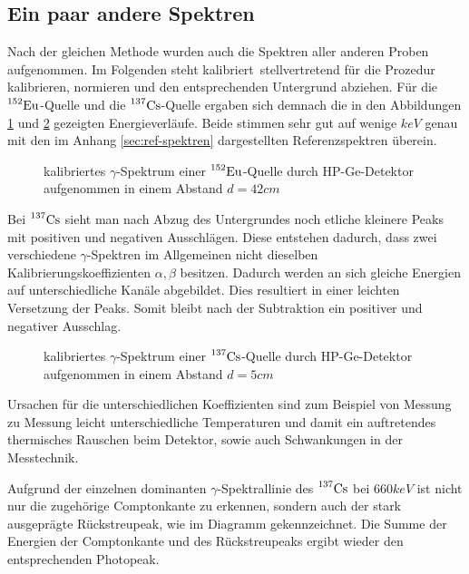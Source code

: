 	\FloatBarrier
	\subsection{Ein paar andere Spektren}
	\label{ssec:andere spektren}
		
		Nach der gleichen Methode wurden auch die Spektren aller anderen Proben aufgenommen.
		Im Folgenden steht \glqq kalibriert\grqq\ stellvertretend für die Prozedur kalibrieren, normieren und den entsprechenden Untergrund abziehen.
		Für die $\prescript{152}{}{\mathrm{Eu}}$-Quelle und die $\prescript{137}{}{\mathrm{Cs}}$-Quelle ergaben sich demnach die in den Abbildungen \ref{fig:eu-152-spec-back} und \ref{fig:cs-137-spec-back} gezeigten Energieverläufe.
		Beide stimmen sehr gut auf wenige $\unit{keV}$ genau mit den im Anhang \ref{sec:ref-spektren} dargestellten Referenzspektren überein.

		\begin{figure}[htb]
			\centering
			
			\caption{kalibriertes $\gamma$-Spektrum einer $\prescript{152}{}{\mathrm{Eu}}$-Quelle durch HP-Ge-Detektor aufgenommen in einem Abstand $d=42\unit{cm}$}
			\label{fig:eu-152-spec-back}
		\end{figure}

		Bei $\prescript{137}{}{\mathrm{Cs}}$ sieht man nach Abzug des Untergrundes noch etliche kleinere Peaks mit positiven und negativen Ausschlägen.
		Diese entstehen dadurch, dass zwei verschiedene $\gamma$-Spektren im Allgemeinen nicht dieselben Kalibrierungskoeffizienten $\alpha,\beta$ besitzen.
		Dadurch werden an sich gleiche Energien auf unterschiedliche Kanäle abgebildet.
		Dies resultiert in einer leichten Versetzung der Peaks.
		Somit bleibt nach der Subtraktion ein positiver und negativer Ausschlag.

		\begin{figure}[htb]
			\centering
			
			\caption{kalibriertes $\gamma$-Spektrum einer $\prescript{137}{}{\mathrm{Cs}}$-Quelle durch HP-Ge-Detektor aufgenommen in einem Abstand $d=5\unit{cm}$}
			\label{fig:cs-137-spec-back}
		\end{figure}

		Ursachen für die unterschiedlichen Koeffizienten sind zum Beispiel von Messung zu Messung leicht unterschiedliche Temperaturen und damit ein auftretendes thermisches Rauschen beim Detektor, sowie auch Schwankungen in der Messtechnik.

		Aufgrund der einzelnen dominanten $\gamma$-Spektrallinie des $\prescript{137}{}{\mathrm{Cs}}$ bei $660\unit{keV}$ ist nicht nur die zugehörige Comptonkante zu erkennen, sondern auch der stark ausgeprägte Rückstreupeak, wie im Diagramm gekennzeichnet.
		Die Summe der Energien der Comptonkante und des Rückstreupeaks ergibt wieder den entsprechenden Photopeak.
	
